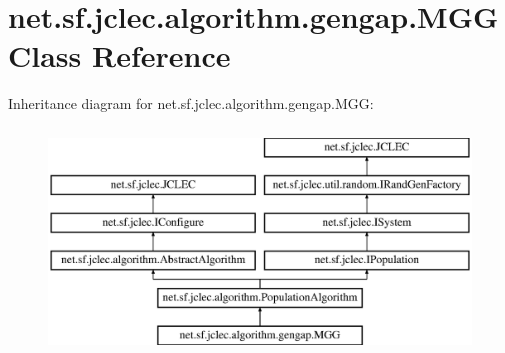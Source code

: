 \hypertarget{classnet_1_1sf_1_1jclec_1_1algorithm_1_1gengap_1_1_m_g_g}{\section{net.\-sf.\-jclec.\-algorithm.\-gengap.\-M\-G\-G Class Reference}
\label{classnet_1_1sf_1_1jclec_1_1algorithm_1_1gengap_1_1_m_g_g}
}
Inheritance diagram for net.\-sf.\-jclec.\-algorithm.\-gengap.\-M\-G\-G\-:\begin{figure}[H]
\begin{center}
\leavevmode
\includegraphics[height=6.000000cm]{classnet_1_1sf_1_1jclec_1_1algorithm_1_1gengap_1_1_m_g_g}
\end{center}
\end{figure}
